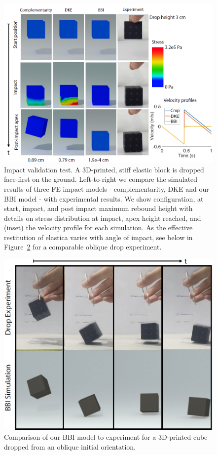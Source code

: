 \begin{figure}
	\centering
	\includegraphics[width=0.8\columnwidth]{images/BBICubeCmp.png}	
	\caption{Impact validation test. A 3D-printed, stiff elastic block is dropped face-first on the ground. Left-to-right we compare the simulated results of three FE impact models  - complementarity, DKE and our BBI model - with experimental results. We show configuration, at start, impact, and post impact maximum rebound height with details on stress distribution at impact, apex height reached, and (inset) the velocity profile for each simulation. As the effective restitution of elastica varies with angle of impact, see below in Figure~\ref{fig:cube_corner} for a comparable oblique drop experiment.}
	\label{fig:BBI_block_compare_all}
\end{figure}

\begin{figure}
	\centering
	\includegraphics[width=0.6\columnwidth]{images/cubeDropCorner.png}	
	\caption{Comparison of our BBI model to experiment for a 3D-printed cube dropped from an oblique initial orientation.}
	\label{fig:cube_corner}
\end{figure}

